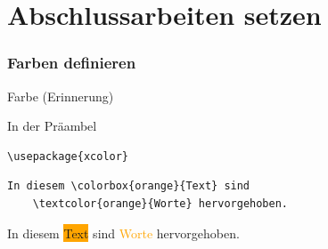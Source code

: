 \malte

\label{chapter-fortgeschritten}
\chapter{Abschlussarbeiten setzen}


\website
\jonny
{}

\subsection{Farben definieren}

\begin{Frame}[fragile]{Farbe (Erinnerung)}
  \begin{Block}{In der Präambel}
    \begin{lstlisting}[gobble=6,style=block]
      \usepackage{xcolor}
    \end{lstlisting}
  \end{Block}

  \xxx

  \begin{lstlisting}[gobble=4]
    In diesem \colorbox{orange}{Text} sind
    \textcolor{orange}{Worte} hervorgehoben.
  \end{lstlisting}

  In diesem \colorbox{orange}{Text} sind
  \textcolor{orange}{Worte} hervorgehoben.
\end{Frame}

